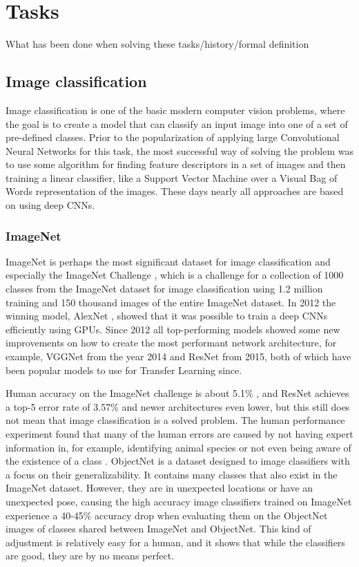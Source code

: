 \chapter{Tasks}
What has been done when solving these tasks/history/formal definition
\section{Image classification}
Image classification is one of the basic modern computer vision problems, where the goal is to create a model that can classify an input image into one of a set of pre-defined classes. Prior to the popularization of applying large Convolutional Neural Networks for this task, the most successful way of solving the problem was to use some algorithm for finding feature descriptors in a set of images and then training a linear classifier, like a Support Vector Machine over a Visual Bag of Words representation of the images. These days nearly all approaches are based on using deep CNNs.
\subsection{ImageNet}
ImageNet  \citep{imagenet}  is perhaps the most significant dataset for image classification and especially the ImageNet Challenge \citep{ILSVRC}, which is a challenge for a collection of 1000 classes from the ImageNet dataset for image classification using 1.2 million training and 150 thousand  images of the entire ImageNet dataset. In 2012 the winning model, AlexNet \citep{alexNet}, showed that it was possible to train a deep CNNs efficiently using GPUs. Since 2012 all top-performing models showed some new improvements on how to create the most performant network architecture, for example, VGGNet from the year 2014 and ResNet \citep{resNet} from 2015, both of which have been popular models to use for Transfer Learning since.

Human accuracy on the ImageNet challenge is about 5.1\% \citep{imageNet_summary}, and ResNet achieves a top-5 error rate of 3.57\% \citep{resNet} and newer architectures even lower, but this still does not mean that image classification is a solved problem. The human performance experiment found that many of the human errors are caused by not having expert information in, for example, identifying animal species or not even being aware of the existence of a class \citep{imageNet_summary}. ObjectNet \citep{objectNet} is a dataset designed to  image classifiers with a focus on their generalizability. It contains many classes that also exist in the ImageNet dataset. However, they are in unexpected locations or have an unexpected pose, causing the high accuracy image classifiers trained on ImageNet experience a 40-45\% accuracy drop when evaluating them on the ObjectNet images of classes shared between ImageNet and ObjectNet. This kind of adjustment is relatively easy for a human, and it shows that while the classifiers are good, they are by no means perfect.
